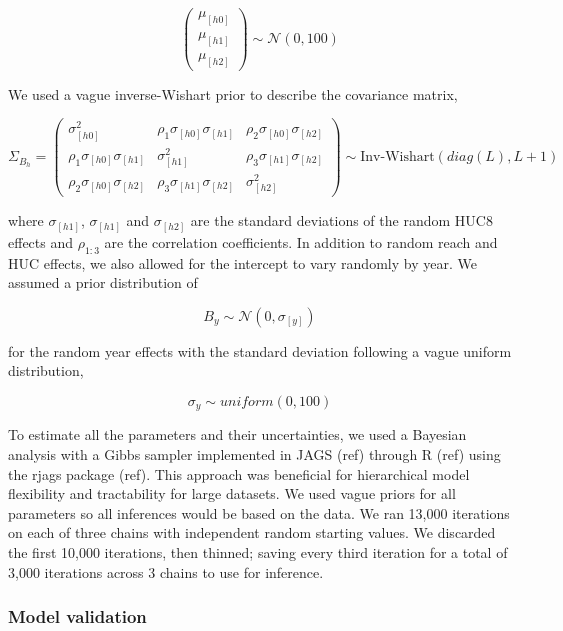 \[ \left( \begin{array}{c} \mu_{[h0]} \\ \mu_{[h1]} \\ \mu_{[h2]} \end{array} \right) \sim \mathcal{N}(0, 100) \]

We used a vague inverse-Wishart prior to describe the covariance matrix,

\[ \Sigma_{B_{h}} = \left( \begin{array}{ccc} \sigma_{[h0]}^2 & \rho_{1}\sigma_{[h0]}\sigma_{[h1]} & \rho_{2}\sigma_{[h0]}\sigma_{[h2]} \\ \rho_{1}\sigma_{[h0]}\sigma_{[h1]} & \sigma_{[h1]}^2 & \rho_{3}\sigma_{[h1]}\sigma_{[h2]} \\ \rho_{2}\sigma_{[h0]}\sigma_{[h2]} & \rho_{3}\sigma_{[h1]}\sigma_{[h2]} & \sigma_{[h2]}^2 \end{array} \right) \sim \text{Inv-Wishart}(diag(L), L+1) \]

where \(\sigma_{[h1]}\), \(\sigma_{[h1]}\) and \(\sigma_{[h2]}\) are the
standard deviations of the random HUC8 effects and \(\rho_{1:3}\) are
the correlation coefficients. In addition to random reach and HUC
effects, we also allowed for the intercept to vary randomly by year. We
assumed a prior distribution of

\[ B_{y} \sim \mathcal{N}(0,\sigma_{[y]}) \]

for the random year effects with the standard deviation following a
vague uniform distribution,

\[ \sigma_{y} \sim uniform(0,100) \]

To estimate all the parameters and their uncertainties, we used a
Bayesian analysis with a Gibbs sampler implemented in JAGS (ref) through
R (ref) using the rjags package (ref). This approach was beneficial for
hierarchical model flexibility and tractability for large datasets. We
used vague priors for all parameters so all inferences would be based on
the data. We ran 13,000 iterations on each of three chains with
independent random starting values. We discarded the first 10,000
iterations, then thinned; saving every third iteration for a total of
3,000 iterations across 3 chains to use for inference.

\subsubsection{Model validation}\label{model-validation}

